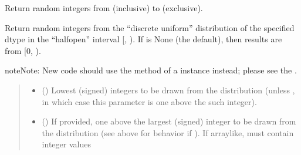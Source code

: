\documentclass[letterpaper,10pt,english]{sphinxmanual}
\begin{document}
\begin{fulllineitems}
\label{\detokenize{metilda.controllers:metilda.controllers.pitch_art_wizard.randint}}
\pysigstartsignatures
{}
\pysigstopsignatures
\sphinxAtStartPar
Return random integers from  (inclusive) to  (exclusive).

\sphinxAtStartPar
Return random integers from the “discrete uniform” distribution of
the specified dtype in the “half\sphinxhyphen{}open” interval {[}, ). If
 is None (the default), then results are from {[}0, ).

\begin{sphinxadmonition}{note}{Note:}
\sphinxAtStartPar
New code should use the 
method of a  instance instead;
please see the .
\end{sphinxadmonition}
\begin{quote}\begin{description}
\begin{itemize}
\item {} 
\sphinxAtStartPar
{} () \textendash{} Lowest (signed) integers to be drawn from the distribution (unless
, in which case this parameter is one above the
 such integer).

\item {} 
\sphinxAtStartPar
{} (\sphinxstyleliteralemphasis{\sphinxupquote{, }}) \textendash{} If provided, one above the largest (signed) integer to be drawn
from the distribution (see above for behavior if ).
If array\sphinxhyphen{}like, must contain integer values


\end{itemize}
\end{description}
\end{quote}
\end{fulllineitems}
\end{document}
